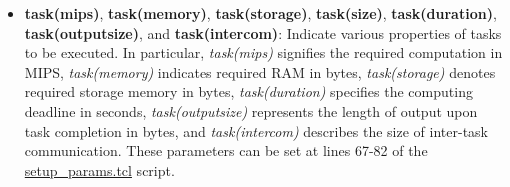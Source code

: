 \begin{itemize}
    \item \textbf{task(mips)}, \textbf{task(memory)}, \textbf{task(storage)}, \textbf{task(size)}, \textbf{task(duration)}, \textbf{task(outputsize)}, and \textbf{task(intercom)}: Indicate various properties of tasks to be executed. In particular, \emph{task(mips)} signifies the required computation in MIPS, \emph{task(memory)} indicates required RAM in bytes, \emph{task(storage)} denotes required storage memory in bytes, \emph{task(duration)} specifies the computing deadline in seconds, \emph{task(outputsize)} represents the length of output upon task completion in bytes, and \emph{task(intercom)} describes the size of inter-task communication. These parameters can be set at lines 67-82 of the \href{https://github.com/vincenzo-emanuele/masters-degree-thesis/blob/main/greencloud\_modified\_src/scripts/setup\_params.tcl}{setup\_params.tcl} script.



\end{itemize}

